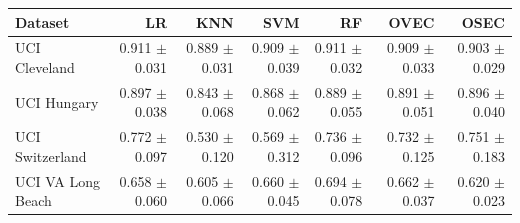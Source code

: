 \begin{tabular}{lrrrrrr}
\toprule
Dataset & LR & KNN & SVM & RF & OVEC & OSEC \\
\midrule
UCI Cleveland & 0.911 $\pm$ 0.031 & 0.889 $\pm$ 0.031 & 0.909 $\pm$ 0.039 & 0.911 $\pm$ 0.032 & 0.909 $\pm$ 0.033 & 0.903 $\pm$ 0.029 \\
UCI Hungary & 0.897 $\pm$ 0.038 & 0.843 $\pm$ 0.068 & 0.868 $\pm$ 0.062 & 0.889 $\pm$ 0.055 & 0.891 $\pm$ 0.051 & 0.896 $\pm$ 0.040 \\
UCI Switzerland & 0.772 $\pm$ 0.097 & 0.530 $\pm$ 0.120 & 0.569 $\pm$ 0.312 & 0.736 $\pm$ 0.096 & 0.732 $\pm$ 0.125 & 0.751 $\pm$ 0.183 \\
UCI VA Long Beach & 0.658 $\pm$ 0.060 & 0.605 $\pm$ 0.066 & 0.660 $\pm$ 0.045 & 0.694 $\pm$ 0.078 & 0.662 $\pm$ 0.037 & 0.620 $\pm$ 0.023 \\
\bottomrule
\end{tabular}
